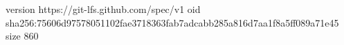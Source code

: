version https://git-lfs.github.com/spec/v1
oid sha256:75606d97578051102fae3718363fab7adcabb285a816d7aa1f8a5ff089a71e45
size 860
